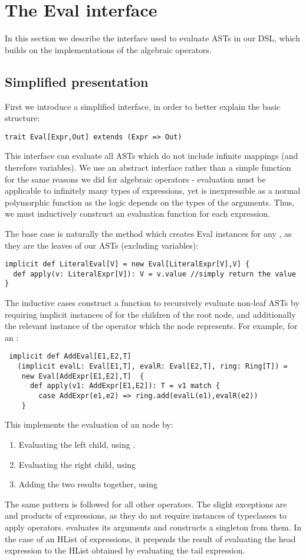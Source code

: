 \section{The Eval interface}
In this section we describe the interface used to evaluate ASTs in our DSL, which builds on the implementations of the algebraic operators.
\subsection{Simplified presentation}
First we introduce a simplified interface, in order to better explain the basic structure:
\begin{lstlisting}
trait Eval[Expr,Out] extends (Expr => Out)
\end{lstlisting}
This interface can evaluate all ASTs which do not include infinite mappings (and therefore variables). We use an abstract interface rather than a simple function for the same reasons we did for algebraic operators - evaluation must be applicable to infinitely many types of expressions, yet is inexpressible as a normal polymorphic function as the logic depends on the types of the arguments. Thus, we must inductively construct an evaluation function for each expression.

The base case is naturally the method which creates Eval instances for any , as they are the leaves of our ASTs (excluding variables):
\vs\begin{lstlisting}
implicit def LiteralEval[V] = new Eval[LiteralExpr[V],V] {
  def apply(v: LiteralExpr[V]): V = v.value //simply return the value
}
\end{lstlisting}\vs
The inductive cases construct a function to recursively evaluate non-leaf ASTs by requiring implicit instances of  for the children of the root node, and additionally the relevant instance of the operator which the node represents. For example, for an :
\vs\begin{lstlisting}
 implicit def AddEval[E1,E2,T]
   (implicit evalL: Eval[E1,T], evalR: Eval[E2,T], ring: Ring[T]) =
    new Eval[AddExpr[E1,E2],T]  {
      def apply(v1: AddExpr[E1,E2]): T = v1 match {
        case AddExpr(e1,e2) => ring.add(evalL(e1),evalR(e2))
    }
\end{lstlisting}\vs
This implements the evaluation of an  node by:
\begin{enumerate}
\item{Evaluating the left child, using }.
\item{Evaluating the right child, using }
\item{Adding the two results together, using }
\end{enumerate}
The same pattern is followed for all other operators. The slight exceptions are  and products of expressions, as they do not require instances of typeclasses to apply operators.  evaluates its arguments and constructs a singleton  from them. In the case of an HList of expressions, it prepends the result of evaluating the head expression to the HList obtained by evaluating the tail expression.

